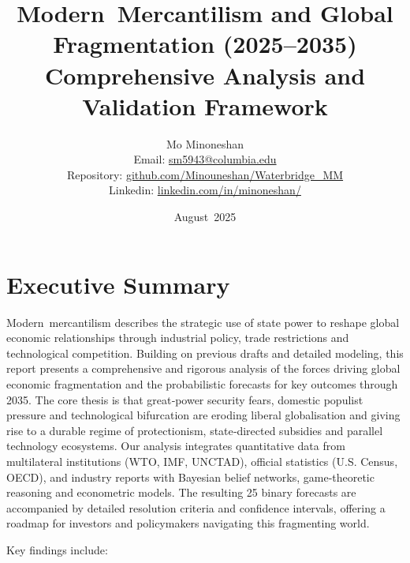 \documentclass[12pt]{article}
\title{Modern Mercantilism and Global Fragmentation (2025--2035)\\Comprehensive Analysis and Validation Framework}
\author{Mo Minoneshan\\
\small Email: \href{mailto:sm5943@columbia.edu}{sm5943@columbia.edu}\\
\small Repository: \url{github.com/Minouneshan/Waterbridge_MM}\\
\small Linkedin: \url{linkedin.com/in/minoneshan/}
}
\date{August 2025}
\begin{document}
\maketitle

\tableofcontents

\clearpage

\section{Executive Summary}

Modern mercantilism describes the strategic use of state power to reshape global economic relationships through industrial policy, trade restrictions and technological competition.  Building on previous drafts and detailed modeling, this report presents a comprehensive and rigorous analysis of the forces driving global economic fragmentation and the probabilistic forecasts for key outcomes through 2035.  The core thesis is that great‑power security fears, domestic populist pressure and technological bifurcation are eroding liberal globalisation and giving rise to a durable regime of protectionism, state‑directed subsidies and parallel technology ecosystems.  Our analysis integrates quantitative data from multilateral institutions (WTO, IMF, UNCTAD), official statistics (U.S. Census, OECD), and industry reports with Bayesian belief networks, game‑theoretic reasoning and econometric models.  The resulting 25 binary forecasts are accompanied by detailed resolution criteria and confidence intervals, offering a roadmap for investors and policymakers navigating this fragmenting world.

Key findings include:
\end{document}
